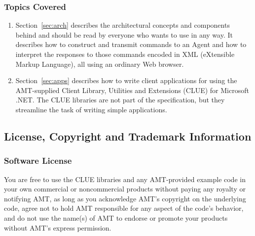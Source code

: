 \subsubsection{Topics Covered}

\begin{enumerate}
\item Section~\ref{sec:arch} describes the architectural concepts and
  components behind \mtc{} and should be read by everyone who wants
  to use \mtc{} in any way.  It describes 
  how to construct and transmit
  commands to an \mtc{} Agent and how to interpret the responses to
  those commands encoded in XML (eXtensible Markup Language), all using
  an ordinary Web browser.
\item Section~\ref{sec:apps} describes how to write client applications
  for \mtc{} using the AMT-supplied Client Library, Utilities and
  Extensions (CLUE) for Microsoft .NET.  The CLUE libraries are not part
  of the \mtc{} specification, but they streamline the task of writing
  simple \mtc{} applications.
\end{enumerate}



\subsection{License, Copyright and Trademark Information}
\label{sec:license}

\subsubsection{Software License}

You are free to use the CLUE libraries and any AMT-provided example code
in your own commercial or
noncommercial products without paying any royalty or notifying AMT, as
long as you acknowledge AMT's copyright on the underlying code, agree
not to hold AMT responsible for any aspect of the code's behavior, and
do not use the name(s) of AMT to endorse or promote your products
without AMT's express permission.

